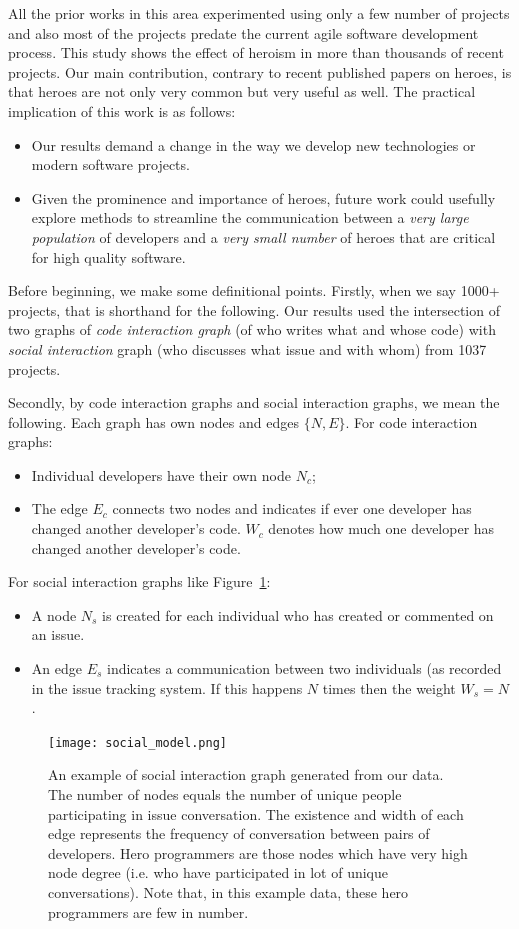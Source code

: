 \documentclass[smallextended]{svjour3}
\newcommand{\bi}{\begin{itemize}}
\newcommand{\ei}{\end{itemize}}
\newcommand{\fig}[1]{Figure~\ref{fig:#1}}
\begin{document}
All the prior works in this area experimented using only a few number of projects and also most of the projects predate the current agile software development process. This study shows the effect of heroism in more than thousands of recent projects. Our main contribution, contrary to recent published papers on heroes, is that heroes are not only very common but very useful as well.
The practical implication of  this work is as follows:
\bi
\item
Our results  demand a 
change in the way we develop new technologies or modern software projects.
\item
Given the prominence and importance of heroes, future work could usefully explore
methods  to streamline 
the communication between  a 
{\em very large population} of developers and a 
{\em very small number} of heroes that are critical for high quality software.
\ei
Before beginning, we make some definitional points.
Firstly, when we say 1000+ projects, that is shorthand for the following.
Our results used the intersection of two graphs of  {\em code interaction graph} (of who writes what and whose code) with {\em social interaction} graph (who discusses what issue and with whom) from 1037 projects.

Secondly, by code interaction graphs
and  social interaction graphs, we mean the following. Each graph
has   own nodes and edges $\{N,E\}$. For
code interaction graphs:
\bi
\item Individual developers have their own  node $N_c$;
\item
The edge $E_c$ connects two nodes and indicates
if ever one  developer has changed another developer's code. $W_c$ denotes how much one developer has changed another developer's code.
\ei
For social interaction graphs like \fig{Socialgraph}:
\bi
\item A node $N_s$ is created for each  individual who has
created or commented on an issue.
\item An edge $E_s$ indicates a communication between two individuals
(as recorded in the issue tracking system.
If this happens $N$ times then the weight $W_s=N$.
\ei


 \begin{figure}[!t]
\begin{center}
\texttt{[image: social\_model.png]}
\end{center}
\caption{An example of social interaction graph generated from our data. 
The number  of nodes equals the number of unique people participating in issue conversation.
The existence and width  of each edge represents the frequency of conversation between pairs of developers. Hero programmers are those nodes which have very high node degree (i.e. who have participated in lot of unique conversations). Note that, in this example data, these hero
programmers are few in number.}
\label{fig:Socialgraph}
\end{figure}
\end{document}
